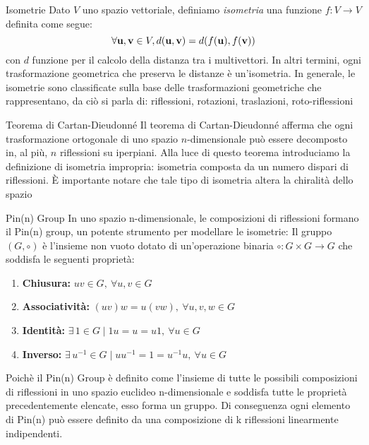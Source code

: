 \begin{frame}{Isometrie}
    Dato \(V\) uno spazio vettoriale, 
    definiamo \emph{isometria} una funzione \(f \colon V \to V\) definita come segue:
    \[
        \forall \mathbf{u}, \mathbf{v} \in V, d(\mathbf{u}, \mathbf{v}) = d(f(\mathbf{u}), f(\mathbf{v}))
    \]
    con \(d\) funzione per il calcolo della distanza tra i multivettori.
    In altri termini, ogni trasformazione geometrica che preserva le distanze
    è un'isometria. In generale,
    le isometrie sono classificate sulla base delle trasformazioni geometriche che rappresentano,
    da ciò si parla di: riflessioni, rotazioni, traslazioni, roto-riflessioni
\end{frame}

\begin{frame}{Teorema di Cartan-Dieudonné}
   Il teorema di Cartan-Dieudonné afferma che ogni trasformazione ortogonale
   di uno spazio \(n\)-dimensionale può essere decomposto in, al più, 
   \(n\) riflessioni su iperpiani.
   Alla luce di questo teorema introduciamo la definizione di isometria impropria: 
   isometria composta da un numero dispari di riflessioni. 
   È importante notare che tale tipo di isometria altera la chiralità dello spazio
\end{frame}

\begin{frame}{Pin(n) Group}
   In uno spazio n-dimensionale, le composizioni di riflessioni formano il Pin(n) group, un potente strumento per modellare le isometrie:
   Il gruppo \((G, \circ)\) è l’insieme non vuoto dotato di un'operazione binaria \(\circ : G \times G \to G\) che soddisfa le seguenti proprietà:
   
   \begin{enumerate}
      \item \textbf{Chiusura:} \( uv \in G, \ \forall u, v \in G \)
      \item \textbf{Associatività:} \( (uv)w = u(vw), \ \forall u, v, w \in G \)
      \item \textbf{Identità:} \( \exists \, 1 \in G \mid 1u = u = u1, \ \forall u \in G \)
      \item \textbf{Inverso:} \( \exists \, u^{-1} \in G \mid uu^{-1} = 1 = u^{-1}u, \ \forall u \in G \)
    \end{enumerate}
\end{frame}

\begin{frame}
   Poichè il Pin(n) Group è definito come l’insieme di tutte le possibili composizioni di riflessioni in uno spazio euclideo n-dimensionale
   e soddisfa tutte le proprietà precedentemente elencate, esso forma un gruppo.
   Di conseguenza ogni elemento di Pin(n) può essere definito da una composizione di k riflessioni linearmente indipendenti.
\end{frame}

